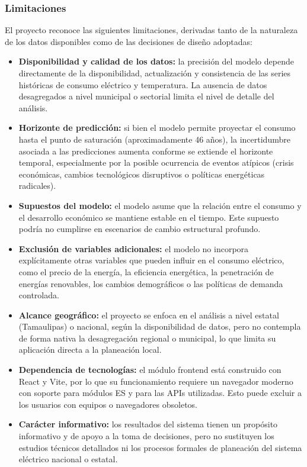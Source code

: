 \subsubsection{Limitaciones} \label{subsec:limitaciones}
El proyecto reconoce las siguientes limitaciones, derivadas tanto de la naturaleza de los datos disponibles como de las decisiones de diseño adoptadas:

\begin{itemize}
    \item \textbf{Disponibilidad y calidad de los datos:} la precisión del modelo depende directamente de la disponibilidad, actualización y consistencia de las series históricas de consumo eléctrico y temperatura. La ausencia de datos desagregados a nivel municipal o sectorial limita el nivel de detalle del análisis.
    
    \item \textbf{Horizonte de predicción:} si bien el modelo permite proyectar el consumo hasta el punto de saturación (aproximadamente 46 años), la incertidumbre asociada a las predicciones aumenta conforme se extiende el horizonte temporal, especialmente por la posible ocurrencia de eventos atípicos (crisis económicas, cambios tecnológicos disruptivos o políticas energéticas radicales).
    
    \item \textbf{Supuestos del modelo:} el modelo asume que la relación entre el consumo y el desarrollo económico se mantiene estable en el tiempo. Este supuesto podría no cumplirse en escenarios de cambio estructural profundo.
    
    \item \textbf{Exclusión de variables adicionales:} el modelo no incorpora explícitamente otras variables que pueden influir en el consumo eléctrico, como el precio de la energía, la eficiencia energética, la penetración de energías renovables, los cambios demográficos o las políticas de demanda controlada.
    
    \item \textbf{Alcance geográfico:} el proyecto se enfoca en el análisis a nivel estatal (Tamaulipas) o nacional, según la disponibilidad de datos, pero no contempla de forma nativa la desagregación regional o municipal, lo que limita su aplicación directa a la planeación local.
    
    \item \textbf{Dependencia de tecnologías:} el módulo frontend está construido con React y Vite, por lo que su funcionamiento requiere un navegador moderno con soporte para módulos ES y para las APIs utilizadas. Esto puede excluir a los usuarios con equipos o navegadores obsoletos.
    
    \item \textbf{Carácter informativo:} los resultados del sistema tienen un propósito informativo y de apoyo a la toma de decisiones, pero no sustituyen los estudios técnicos detallados ni los procesos formales de planeación del sistema eléctrico nacional o estatal.
\end{itemize}